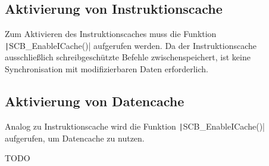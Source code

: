 \subsection{Aktivierung von Instruktionscache}

Zum Aktivieren des Instruktionscaches muss die Funktion
\texttt|SCB_EnableICache()| aufgerufen werden. Da der Instruktionscache
ausschließlich schreibgeschützte Befehle zwischenspeichert, ist keine
Synchronisation mit modifizierbaren Daten erforderlich.

\subsection{Aktivierung von Datencache}

Analog zu Instruktionscache wird die Funktion
\texttt|SCB_EnableICache()| aufgerufen, um Datencache zu nutzen.

TODO
